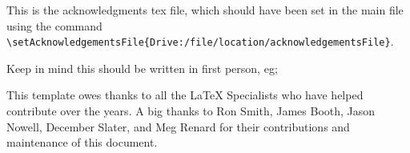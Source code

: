This is the acknowledgments tex file, which should have been set in the main file using the command \verb|\setAcknowledgementsFile{Drive:/file/location/acknowledgementsFile}|.

Keep in mind this should be written in first person, eg;

This template owes thanks to all the LaTeX Specialists who have helped contribute over the years. A big thanks to Ron Smith, James Booth, Jason Nowell, December Slater, and Meg Renard for their contributions and maintenance of this document.  